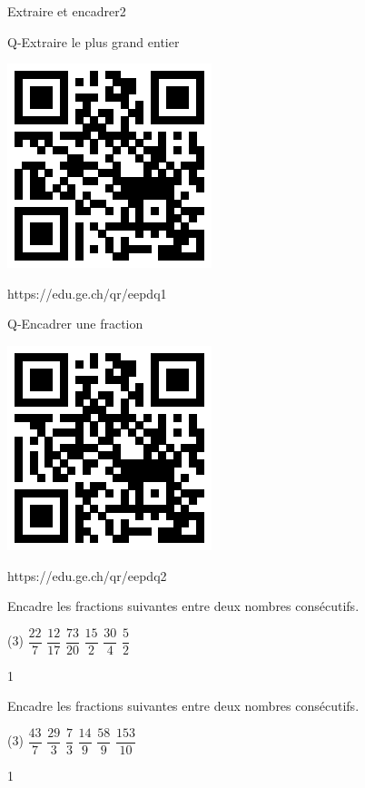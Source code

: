 \documentclass[a4paper,12pt]{report}
\begin{document}
\begin{qmoodle}{Extraire et encadrer}{2}{
	\begin{center}	
		Q-Extraire le plus grand entier

\includegraphics[scale=1]{media/qr/eepdq1}

\tiny{{https://edu.ge.ch/qr/eepdq1}}
\end{center}
	\begin{center}	
		Q-Encadrer une fraction

\includegraphics[scale=1]{media/qr/eepdq2}

\tiny{{https://edu.ge.ch/qr/eepdq2}}
\end{center}
}
\end{qmoodle}

\begin{exo}{
Encadre les fractions suivantes entre deux nombres consécutifs.
	\begin{tasks}(3)
\task $\dfrac{22}{7}$
\task $\dfrac{12}{17}$
\task $\dfrac{73}{20}$
\task $\dfrac{15}{2}$
\task $\dfrac{30}{4}$
\task $\dfrac{5}{2}$
\end{tasks}
 \vspace{1pt}
}{1}\end{exo}


\begin{exo}{
Encadre les fractions suivantes entre deux nombres consécutifs.
	\begin{tasks}(3)
\task $\dfrac{43}{7}$
\task $\dfrac{29}{3}$
\task $\dfrac{7}{3}$
\task $\dfrac{14}{9}$
\task $\dfrac{58}{9}$
\task $\dfrac{153}{10}$
\end{tasks}
 \vspace{1pt}
}{1}\end{exo}
\end{document}
